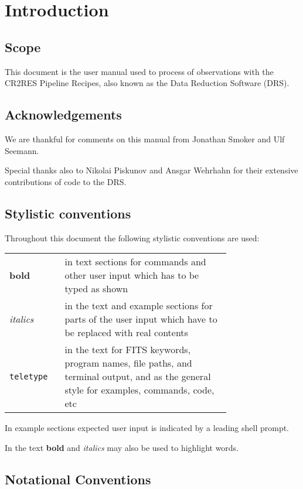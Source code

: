 \section{Introduction}
\label{sec:introduction}

\subsection{Scope}
\label{sec:scope}
This document is the user manual used to process of \instrument{}
observations with the CR2RES
Pipeline Recipes, also known as the \instrument{} Data Reduction Software 
(DRS).


\subsection{Acknowledgements}
We are thankful for comments on this manual from Jonathan Smoker and Ulf
Seemann.

Special thanks also to Nikolai Piskunov and Ansgar
Wehrhahn for their extensive contributions of code
to the DRS.



\subsection{Stylistic conventions}
\label{sec:style}

Throughout this document the following stylistic conventions are used:

\begin{tabular}{lp{0.75\linewidth}}
\textbf{bold}     & in text sections for commands and other
                    user input which has to be typed as shown \\
\textit{italics}  & in the text and example sections for parts of the user
                    input which have to be replaced with real contents \\
\texttt{teletype} & in the text for FITS keywords, program names, file paths,
                    and terminal output, and as the general style for examples,
                    commands, code, etc \\
\end{tabular}

In example sections expected user input is indicated by a leading shell
prompt.

In the text \textbf{bold} and \textit{italics} may also be used to highlight
words.

\subsection{Notational Conventions}
\label{sec:notation}

